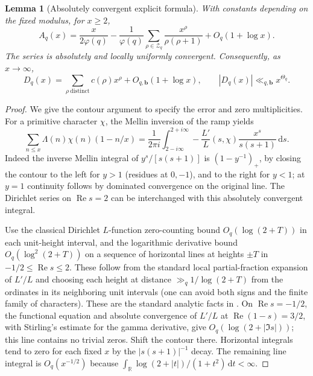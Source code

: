 \documentclass[11pt]{article}
\newtheorem{lemma}[theorem]{Lemma}
\newcommand{\R}{\mathbb R}
\newcommand{\Rea}{\operatorname{Re}}
\newcommand{\dd}{\,\mathrm d}
\begin{document}
\begin{lemma}[Absolutely convergent explicit formula]\label{lem:explicit}
With constants depending on the fixed modulus, for $x\ge2$,
\begin{equation}\label{eq:explicit}
 A_q(x)=\frac{x}{2\varphi(q)}-\frac1{\varphi(q)}\sum_{\rho\in\mathcal Z_q}\frac{x^\rho}{\rho(\rho+1)}+O_q(1+\log x).
\end{equation}
The series is absolutely and locally uniformly convergent. Consequently, as $x\to\infty$,
\begin{equation}\label{eq:Dexplicit}
 D_q(x)=\sum_{\rho\ \mathrm{distinct}}c(\rho)x^\rho+O_{q,\mathbf b}(1+\log x),\qquad |D_q(x)|\ll_{q,\mathbf b} x^{\Theta_q}.
\end{equation}
\end{lemma}
\begin{proof}
We give the contour argument to specify the error and zero multiplicities. For a primitive character $\chi$, the Mellin inversion of the ramp yields
\[
 \sum_{n\le x}\Lambda(n)\chi(n)(1-n/x)
 =\frac{1}{2\pi i}\int_{2-i\infty}^{2+i\infty}-\frac{L'}{L}(s,\chi)\frac{x^s}{s(s+1)}\dd s.
\]
Indeed the inverse Mellin integral of $y^s/[s(s+1)]$ is $(1-y^{-1})_+$, by closing the contour to the left for $y>1$ (residues at $0,-1$), and to the right for $y<1$; at $y=1$ continuity follows by dominated convergence on the original line. The Dirichlet series on $\Rea s=2$ can be interchanged with this absolutely convergent integral.

Use the classical Dirichlet $L$-function zero-counting bound $O_q(\log(2+T))$ in each unit-height interval, and the logarithmic derivative bound $O_q(\log^2(2+T))$ on a sequence of horizontal lines at heights $\pm T$ in $-1/2\le\Rea s\le2$. These follow from the standard local partial-fraction expansion of $L'/L$ and choosing each height at distance $\gg_q 1/\log(2+T)$ from the ordinates in its neighboring unit intervals (one can avoid both signs and the finite family of characters). These are the standard analytic facts in \cite{mv,davenport}. On $\Rea s=-1/2$, the functional equation and absolute convergence of $L'/L$ at $\Rea(1-s)=3/2$, with Stirling's estimate for the gamma derivative, give $O_q(\log(2+|\Im s|))$; this line contains no trivial zeros. Shift the contour there. Horizontal integrals tend to zero for each fixed $x$ by the $|s(s+1)|^{-1}$ decay. The remaining line integral is $O_q(x^{-1/2})$ because $\int_\R \log(2+|t|)/(1+t^2)\dd t<\infty$.


\end{proof}
\end{document}
